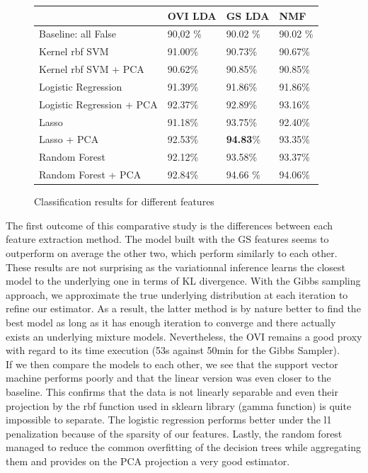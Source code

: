 \documentclass[twoside]{article}
\begin{document}
\begin{multicols}{2}
\begin{figure}[H]
\begin{center}
    \begin{tabular}{| l | l | l | l |}
    \hline
    & OVI LDA & GS LDA & NMF \\ \hline
    Baseline: all False & 90,02 \% &  90.02 \% &  90.02 \% \\ \hline
    Kernel rbf SVM & 91.00\%  &  90.73\%  &  90.67\% \\ \hline
    Kernel rbf SVM + PCA & 90.62\%  &  90.85\%  &  90.85\% \\ \hline
    Logistic Regression & 91.39\%  &  91.86\%  &  91.86\%\\ \hline
    Logistic Regression + PCA & 92.37\%  &  92.89\%  &  93.16\% \\ \hline
    Lasso & 91.18\%  &  93.75\%  &  92.40\% \\ \hline
	Lasso + PCA & 92.53\%  &  \textbf{94.83}\%  &  93.35\% \\ \hline
    Random Forest & 92.12\% &  93.58\% &  93.37\% \\ \hline
    Random Forest + PCA & 92.84\% &  94.66 \% &  94.06\% \\ \hline
    \end{tabular}
\end{center}
\caption{Classification results for different features}
\end{figure}

\noindent The first outcome of this comparative study is the differences between each feature extraction method. The model built with the GS features seems to outperform on average the other two, which perform similarly to each other. These results are not surprising as the variationnal inference learns the closest model to the underlying one in terms of KL divergence. With the Gibbs sampling approach, we approximate the true underlying distribution at each iteration to refine our estimator. As a result, the latter method is by nature better to find the best model as long as it has enough iteration to converge and there actually exists an underlying mixture models. Nevertheless, the OVI remains a good proxy with regard to its time execution (53s against 50min for the Gibbs Sampler).\\

\noindent If we then compare the models to each other, we see that the support vector machine performs poorly and that the linear version was even closer to the baseline. This confirms that the data is not linearly separable and even their projection by the rbf function used in sklearn library (gamma function) is quite impossible to separate. The logistic regression performs better under the l1 penalization because of the sparsity of our features. Lastly, the random forest managed to reduce the common overfitting of the decision trees while aggregating them and provides on the PCA projection a very good estimator.\\


\end{multicols}
\end{document}
